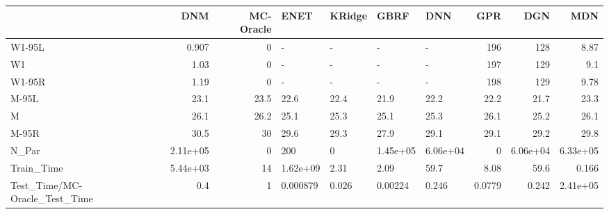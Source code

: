 \begin{tabular}{lrrllllrrr}
\toprule
{} &      DNM &  MC-Oracle &     ENET & KRidge &     GBRF &      DNN &    GPR &      DGN &      MDN \\
\midrule
W1-95L                        &    0.907 &          0 &        - &      - &        - &        - &    196 &      128 &     8.87 \\
W1                            &     1.03 &          0 &        - &      - &        - &        - &    197 &      129 &      9.1 \\
W1-95R                        &     1.19 &          0 &        - &      - &        - &        - &    198 &      129 &     9.78 \\
M-95L                         &     23.1 &       23.5 &     22.6 &   22.4 &     21.9 &     22.2 &   22.2 &     21.7 &     23.3 \\
M                             &     26.1 &       26.2 &     25.1 &   25.3 &     25.1 &     25.3 &   26.1 &     25.2 &     26.1 \\
M-95R                         &     30.5 &         30 &     29.6 &   29.3 &     27.9 &     29.1 &   29.1 &     29.2 &     29.8 \\
N\_Par                         & 2.11e+05 &          0 &      200 &      0 & 1.45e+05 & 6.06e+04 &      0 & 6.06e+04 & 6.33e+05 \\
Train\_Time                    & 5.44e+03 &         14 & 1.62e+09 &   2.31 &     2.09 &     59.7 &   8.08 &     59.6 &    0.166 \\
Test\_Time/MC-Oracle\_Test\_Time &      0.4 &          1 & 0.000879 &  0.026 &  0.00224 &    0.246 & 0.0779 &    0.242 & 2.41e+05 \\
\bottomrule
\end{tabular}

